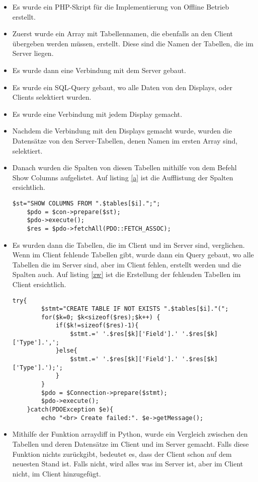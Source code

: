 \begin{itemize}
	\item Es wurde ein PHP-Skript f\"ur die Implementierung von Offline Betrieb erstellt.
	\item Zuerst wurde ein Array mit Tabellennamen, die ebenfalls an den Client übergeben werden müssen,  erstellt. Diese sind die Namen der Tabellen, die im Server liegen.
	\item Es wurde dann eine Verbindung mit dem Server gebaut.
	\item Es wurde ein SQL-Query gebaut, wo alle Daten von den Displays, oder Clients selektiert wurden.
	\item Es wurde eine Verbindung mit jedem Display gemacht.
	\item Nachdem die Verbindung mit den Displays gemacht wurde, wurden die Datens\"atze von den Server-Tabellen, denen Namen im ersten Array sind, selektiert.
	\item Danach wurden die Spalten von diesen Tabellen mithilfe von dem Befehl Show Columns aufgelistet. Auf listing \ref{a} ist die Aufflistung der Spalten ersichtlich. 
	\begin{lstlisting}[frame=single]
	$st="SHOW COLUMNS FROM ".$tables[$i].";";
	$pdo = $con->prepare($st);
	$pdo->execute();
	$res = $pdo->fetchAll(PDO::FETCH_ASSOC);
	\end{lstlisting}
	\label{a}
	\item Es wurden dann die Tabellen, die im Client und im Server sind, verglichen. Wenn im Client fehlende Tabellen gibt, wurde dann ein Query gebaut, wo alle Tabellen die im Server sind, aber im Client fehlen, erstellt werden und die Spalten auch. Auf listing \ref{zw} ist die Erstellung der fehlenden Tabellen im Client ersichtlich.
	 \begin{lstlisting}[frame=single]
	 try{
	 	$stmt="CREATE TABLE IF NOT EXISTS ".$tables[$i]."(";
	 	for($k=0; $k<sizeof($res);$k++) {
	 		if($k!=sizeof($res)-1){
	 			$stmt.=' '.$res[$k]['Field'].' '.$res[$k]['Type'].',';
	 		}else{
	 			$stmt.=' '.$res[$k]['Field'].' '.$res[$k]['Type'].');';
	 		}
	 	}
	 	$pdo = $Connection->prepare($stmt);
	 	$pdo->execute();
	}catch(PDOException $e){
	 	echo "<br> Create failed:". $e->getMessage();
	 \end{lstlisting}
	 \label{zw}
	 \item Mithilfe der Funktion arraydiff in Python, wurde ein Vergleich zwischen den Tabellen und deren Datens\"atze im Client und im Server gemacht. Falls diese Funktion nichts zur\"uckgibt, bedeutet es, dass der Client schon auf dem neuesten Stand ist. Falls nicht, wird alles was im Server ist, aber im Client nicht, im Client hinzugef\"ugt.
\end{itemize}
